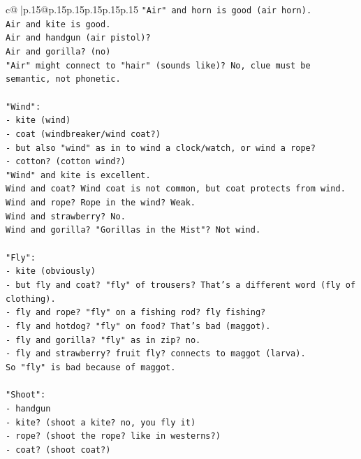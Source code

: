 \documentclass{article}
\begin{document}
{\begin{supertabular}{c@{$\;$}|p{.15\linewidth}@{}p{.15\linewidth}p{.15\linewidth}p{.15\linewidth}p{.15\linewidth}p{.15\linewidth}}
{{{\texttt{"Air" and horn is good (air horn).} \\
\texttt{Air and kite is good.} \\
\texttt{Air and handgun (air pistol)?} \\
\texttt{Air and gorilla? (no)} \\
\texttt{"Air" might connect to "hair" (sounds like)? No, clue must be semantic, not phonetic.} \\
\\ 
\texttt{"Wind":} \\
\texttt{{-} kite (wind)} \\
\texttt{{-} coat (windbreaker/wind coat?)} \\
\texttt{{-} but also "wind" as in to wind a clock/watch, or wind a rope?} \\
\texttt{{-} cotton? (cotton wind?)} \\
\texttt{"Wind" and kite is excellent.} \\
\texttt{Wind and coat? Wind coat is not common, but coat protects from wind.} \\
\texttt{Wind and rope? Rope in the wind? Weak.} \\
\texttt{Wind and strawberry? No.} \\
\texttt{Wind and gorilla? "Gorillas in the Mist"? Not wind.} \\
\\ 
\texttt{"Fly":} \\
\texttt{{-} kite (obviously)} \\
\texttt{{-} but fly and coat? "fly" of trousers? That's a different word (fly of clothing).} \\
\texttt{{-} fly and rope? "fly" on a fishing rod? fly fishing?} \\
\texttt{{-} fly and hotdog? "fly" on food? That's bad (maggot).} \\
\texttt{{-} fly and gorilla? "fly" as in zip? no.} \\
\texttt{{-} fly and strawberry? fruit fly? connects to maggot (larva).} \\
\texttt{So "fly" is bad because of maggot.} \\
\\ 
\texttt{"Shoot":} \\
\texttt{{-} handgun} \\
\texttt{{-} kite? (shoot a kite? no, you fly it)} \\
\texttt{{-} rope? (shoot the rope? like in westerns?)} \\
\texttt{{-} coat? (shoot coat?)} \\
}}}
\end{supertabular}}
\end{document}
